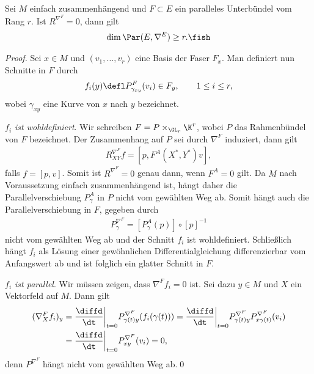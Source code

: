 \documentclass[%
	paper=a5,%
	fleqn,%
	DIV=18,%
	BCOR=0mm,
	fontsize=11pt,
	titlepage=false,%
	bibliography=totoc,
	DIV=18,%
	twoside=true,
	pdftitle=Riemannsche Geometrie,
	pdfauthor=Uwe Semmelmann,
	numbers=noendperiod]%
	{scrbook}
\begin{document}
\begin{prop}
Sei $M$ einfach zusammenhängend und $F\subset E$ ein paralleles Unterbündel vom
Rang $r$. Ist $R^{\nabla^F} = 0$, dann gilt
\begin{align*}
\dim \Par(E,\nabla^E) \ge r.\fish
\end{align*}
\end{prop}
\begin{proof}
Sei $x\in M$ und $(v_1,\ldots,v_r)$ eine Basis der Faser $F_x$. Man definiert
nun Schnitte in $F$ durch
\begin{align*}
f_i(y) \defl P_{\gamma_{xy}}^F(v_i) \in F_y,\qquad 1\le i\le r,
\end{align*} 
wobei $\gamma_{xy}$ eine Kurve von $x$ nach $y$ bezeichnet. 

\textit{$f_i$ ist wohldefiniert}. Wir schreiben $F= P\times_{\GL_r} \K^r$, wobei
$P$ das Rahmenbündel von $F$ bezeichnet. Der Zusammenhang auf $P$ sei durch
$\nabla^F$ induziert, dann gilt
\begin{align*}
R_{XY}^{\nabla^F}f = [p,F^A(X^*,Y^*)v],
\end{align*}
falls $f=[p,v]$. Somit ist $R^{\nabla^F} = 0$ genau dann, wenn $F^A = 0$ gilt.
Da $M$ nach Voraussetzung einfach zusammenhängend ist, hängt daher die
Parallelverschiebung $P_\gamma^A$ in $P$ nicht vom gewählten Weg ab. Somit
hängt auch die Parallelverschiebung in $F$, gegeben durch
\begin{align*}
P^{\nabla^F}_\gamma = [P_\gamma^A(p)]\circ[p]^{-1}
\end{align*}
nicht vom gewählten Weg ab und der Schnitt $f_i$ ist wohldefiniert. Schließlich hängt $f_{i}$ als Lösung einer gewöhnlichen Differentialgleichung differenzierbar vom Anfangswert ab und ist folglich ein glatter Schnitt in $F$.

\textit{$f_i$ ist parallel}. Wir müssen zeigen, dass $\nabla^F f_i = 0$ ist.
Sei dazu $y\in M$ und $X$ ein Vektorfeld auf $M$. Dann gilt
\begin{align*}
(\nabla_X^F f_i)_y  &= 
\frac{\diffd}{\dt}\bigg|_{t=0} P_{\gamma(t)y}^{\nabla^F}(f_i(\gamma(t)))
= 
\frac{\diffd}{\dt}\bigg|_{t=0}
P_{\gamma(t)y}^{\nabla^F}P_{x\gamma(t)}^{\nabla^F}(v_i)\\
&
= 
\frac{\diffd}{\dt}\bigg|_{t=0}
P_{xy}^{\nabla^F}(v_i) = 0,
\end{align*}
denn $P^{\nabla^F}$ hängt nicht vom gewählten Weg ab.\qed 
\end{proof}
\end{document}
